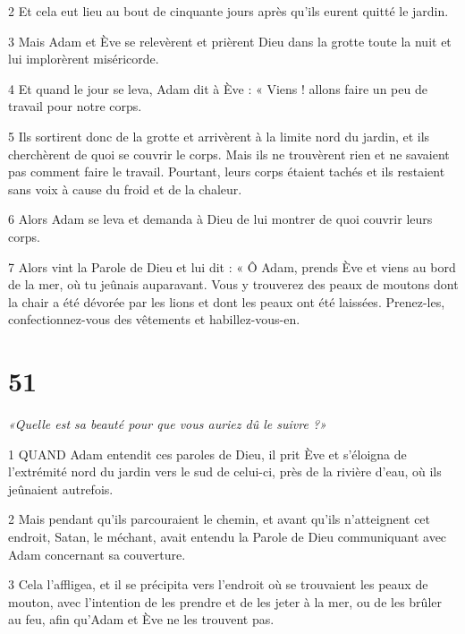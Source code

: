 \par 2 Et cela eut lieu au bout de cinquante jours après qu'ils eurent quitté le jardin.

\par 3 Mais Adam et Ève se relevèrent et prièrent Dieu dans la grotte toute la nuit et lui implorèrent miséricorde.

\par 4 Et quand le jour se leva, Adam dit à Ève : « Viens ! allons faire un peu de travail pour notre corps.

\par 5 Ils sortirent donc de la grotte et arrivèrent à la limite nord du jardin, et ils cherchèrent de quoi se couvrir le corps. Mais ils ne trouvèrent rien et ne savaient pas comment faire le travail. Pourtant, leurs corps étaient tachés et ils restaient sans voix à cause du froid et de la chaleur.

\par 6 Alors Adam se leva et demanda à Dieu de lui montrer de quoi couvrir leurs corps.

\par 7 Alors vint la Parole de Dieu et lui dit : « Ô Adam, prends Ève et viens au bord de la mer, où tu jeûnais auparavant. Vous y trouverez des peaux de moutons dont la chair a été dévorée par les lions et dont les peaux ont été laissées. Prenez-les, confectionnez-vous des vêtements et habillez-vous-en.

\chapter{51}

\par \textit{«Quelle est sa beauté pour que vous auriez dû le suivre ?»}

\par 1 QUAND Adam entendit ces paroles de Dieu, il prit Ève et s'éloigna de l'extrémité nord du jardin vers le sud de celui-ci, près de la rivière d'eau, où ils jeûnaient autrefois.

\par 2 Mais pendant qu'ils parcouraient le chemin, et avant qu'ils n'atteignent cet endroit, Satan, le méchant, avait entendu la Parole de Dieu communiquant avec Adam concernant sa couverture.

\par 3 Cela l'affligea, et il se précipita vers l'endroit où se trouvaient les peaux de mouton, avec l'intention de les prendre et de les jeter à la mer, ou de les brûler au feu, afin qu'Adam et Ève ne les trouvent pas.

